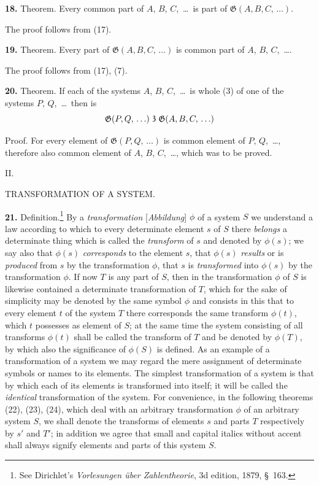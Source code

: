 \documentclass[oneside]{book}
\makeatletter
\newcommand\partof{\mathrel{\raisebox{0.45ex}{$\mathfrak{3}$}}}   %
\newcommand\mypara{\medskip\textbf}
\newcommand\mysect[3]{
\medskip\begin{center}{\large #2.}\end{center}
\begin{center}\uppercase{#3.}\end{center}
\addcontentsline{toc}{section}{\protect\phantom{#1}#2\@. #3}
}
\makeatother
\begin{document}
\mypara{18.} Theorem. Every common part of $A$, $B$, $C$,~\ldots\
is part of $\mathfrak{G}(A, B, C,\,\ldots)$.

The proof follows from (17).

\mypara{19.} Theorem. Every part of $\mathfrak{G}(A, B, C,\,\ldots)$ is
common part of $A$, $B$, $C$,~\ldots.

The proof follows from (17), (7).

\mypara{20.} Theorem. If each of the systems $A$, $B$, $C$,~\ldots\
is whole (3) of one of the systems $P$, $Q$,~\ldots\ then is
\[
\mathfrak{G}(P, Q,\,\ldots) \partof \mathfrak{G}(A, B, C,\,\ldots)
\]

Proof. For every element of $\mathfrak{G}(P, Q,\,\ldots)$ is
common element of $P$, $Q$,~\ldots, therefore also common
element of $A$, $B$, $C$,~\ldots, which was to be proved.


\mysect{XVI}{II}{Transformation of a System}

\mypara{21.} Definition.\footnote
  {See Dirichlet's \textit{Vorlesungen über Zahlentheorie}, 3d edition, 1879, §~163.}
By a \textit{transformation} [\textit{Abbildung}]
$\phi$ of a system $S$ we understand a law according to
which to every determinate element $s$ of $S$ there \textit{belongs}
a determinate thing which is called the \textit{transform}
of $s$ and denoted by $\phi(s)$; we say also that $\phi(s)$
\textit{corresponds} to the element $s$, that $\phi(s)$ \textit{results} or is
\textit{produced} from $s$ by the transformation $\phi$, that $s$ is
\textit{transformed} into $\phi(s)$ by the transformation $\phi$. If now
$T$ is any part of $S$, then in the transformation $\phi$ of $S$
is likewise contained a determinate transformation of
$T$, which for the sake of simplicity may be denoted by
the same symbol $\phi$ and consists in this that to every
element $t$ of the system $T$ there corresponds the same
transform $\phi(t)$, which $t$ possesses as element of $S$; at
the same time the system consisting of all transforms
$\phi(t)$ shall be called the transform of $T$ and be denoted
by $\phi(T)$, by which also the significance of $\phi(S)$ is
defined. As an example of a transformation of a system
we may regard the mere assignment of determinate
symbols or names to its elements. The simplest
transformation of a system is that by which each
of its elements is transformed into itself; it will be
called the \textit{identical} transformation of the system. For
convenience, in the following theorems (22), (23),
(24), which deal with an arbitrary transformation $\phi$ of
an arbitrary system $S$, we shall denote the transforms
of elements $s$ and parts $T$ respectively by $s'$ and $T'$;
in addition we agree that small and capital italics
without accent shall always signify elements and parts
of this system $S$.
\end{document}
